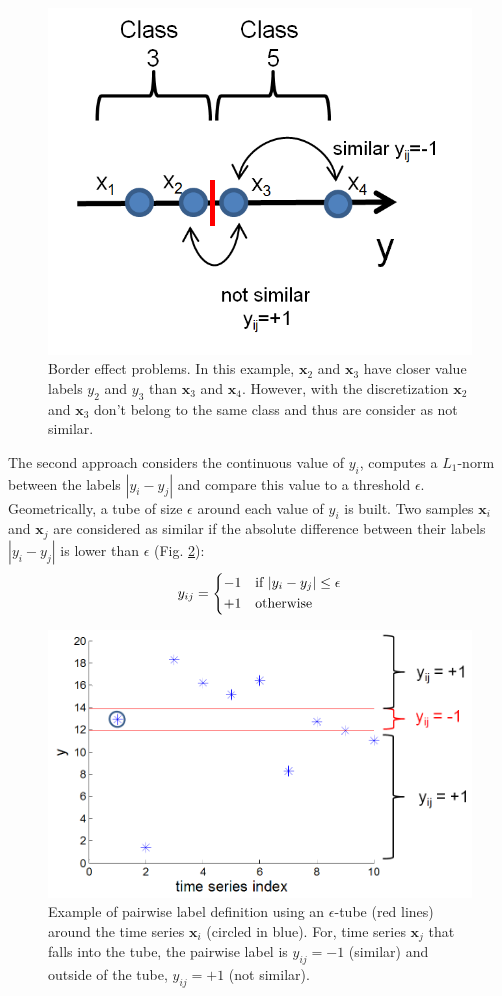 \begin{figure}[h!]
	\centering
	\includegraphics[width=0.4\linewidth]{images/Discretize_binning_border_effect}
	\caption{Border effect problems. In this example, $\textbf{x}_2$ and $\textbf{x}_3$ have closer value labels $y_2$ and $y_3$ than $\textbf{x}_3$ and $\textbf{x}_4$. However, with the discretization $\textbf{x}_2$ and $\textbf{x}_3$ don't belong to the same class and thus are consider as not similar.}
	\label{fig:Discretize_binning_border_effect}
\end{figure}

\noindent The second approach considers the continuous value of $y_i$, computes a $L_1$-norm between the labels $|y_i-y_j|$ and compare this value to a threshold $\epsilon$. Geometrically, a tube of size $\epsilon$ around each value of $y_i$ is built. Two samples $\textbf{x}_i$ and  $\textbf{x}_j$ are considered as similar if the absolute difference between their labels $|y_i-y_j|$ is lower than $\epsilon$ (Fig. \ref{fig:pairwise_label_tube}):
\begin{equation}
y_{ij} = 
\left\{
\begin{split}
\begin{aligned}
-1 & \text{\quad if } |y_i-y_j| \leq \epsilon \\ 
+1 & \text{\quad otherwise }
\end{aligned} 
\end{split}
\right.
\end{equation}

\begin{figure}[h!]
	\centering
	\includegraphics[width=0.65\linewidth]{images/pairwise_label_tube}
	\caption{Example of pairwise label definition using an $\epsilon$-tube (red lines) around the time series $\textbf{x}_i$ (circled in blue). For, time series $\textbf{x}_j$ that falls into the tube, the pairwise label is $y_{ij} = -1$ (similar) and outside of the tube, $y_{ij} = +1$ (not similar).}
	\label{fig:pairwise_label_tube}
\end{figure}

